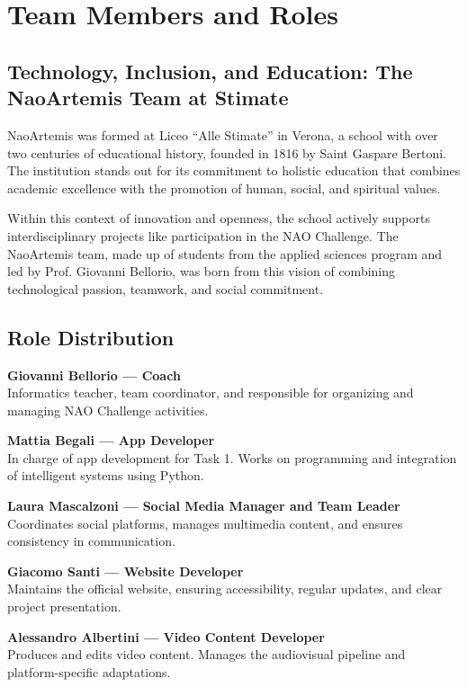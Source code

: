 \documentclass{optica-article}
\begin{document}
\section{Team Members and Roles}

\subsection{Technology, Inclusion, and Education: The NaoArtemis Team at Stimate}
NaoArtemis was formed at Liceo “Alle Stimate” in Verona, a school with over two centuries of educational history, founded in 1816 by Saint Gaspare Bertoni. The institution stands out for its commitment to holistic education that combines academic excellence with the promotion of human, social, and spiritual values.

Within this context of innovation and openness, the school actively supports interdisciplinary projects like participation in the NAO Challenge. The NaoArtemis team, made up of students from the applied sciences program and led by Prof. Giovanni Bellorio, was born from this vision of combining technological passion, teamwork, and social commitment.

\subsection{Role Distribution}
\textbf{Giovanni Bellorio — Coach} \\Informatics teacher, team coordinator, and responsible for organizing and managing NAO Challenge activities.

\textbf{Mattia Begali — App Developer} \\In charge of app development for Task 1. Works on programming and integration of intelligent systems using Python.

\textbf{Laura Mascalzoni — Social Media Manager and Team Leader} \\Coordinates social platforms, manages multimedia content, and ensures consistency in communication.

\textbf{Giacomo Santi — Website Developer} \\Maintains the official website, ensuring accessibility, regular updates, and clear project presentation.

\textbf{Alessandro Albertini — Video Content Developer} \\Produces and edits video content. Manages the audiovisual pipeline and platform-specific adaptations.
\end{document}
